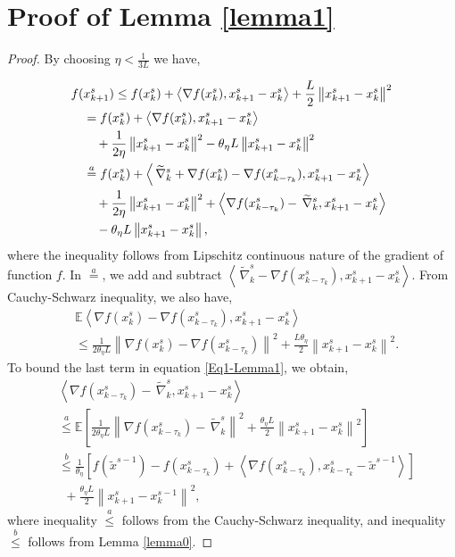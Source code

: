 \documentclass[conference]{IEEEtran}
\newcommand*{\E}{\mathbb{E}}
\newcommand*{\VRG}{\,\widetilde{\nabla}_k^s}
\newcommand{\norm}[1]{\left\lVert#1\right\rVert}
\newcommand{\Iprod}[2]{\left\langle #1,#2\right\rangle}
\theoremstyle{definition}
\theoremstyle{remark}
\begin{document}
\section{Proof of Lemma \ref{lemma1}}\label{append}
\begin{proof}
By choosing $\eta < \frac{1}{3L}$ we have,

\begin{gather}
\label{Eq1-Lemma1}
\begin{split}
f(&x_{k+1}^s)  \leq f(x_{k}^s) + \Iprod{\nabla f(x_{k}^s)}{x_{k+1}^s-x_{k}^s}+\frac{L}{2}\norm{x_{k+1}^s-x_{k}^s}^2\\
&=f(x_{k}^s) + \Iprod{\nabla f(x_{k}^s)}{x_{k+1}^s-x_{k}^s}\\
&~~~+ {\frac{1 }{2\eta}}\norm{x_{k+1}^s-x_{k}^s}^2-{\theta_{\eta} L}\norm{x_{k+1}^s-x_{k}^s}^2\\
&\stackrel{a}{=}f(x_{k}^s) + \Iprod{\VRG+\nabla f(x_{k}^s)-\nabla f(x_{k-\tau_k}^s)}{x_{k+1}^s-x_{k}^s}\\
&~~~+ { \frac{1}{2\eta}}\norm{x_{k+1}^s-x_{k}^s}^2+\Iprod{\nabla f(x_{k-\tau_k}^s)-\VRG}{x_{k+1}^s-x_{k}^s}\\
&~~~-{\theta_{\eta} L}\norm{x_{k+1}^s-x_{k}^s},
\end{split}
\raisetag{15pt}
\end{gather}
where the inequality follows from Lipschitz continuous nature of the gradient of function $f$. In $\stackrel{a}{=}$, we add and subtract $\Iprod{\VRG-\nabla f(x_{k-\tau_k}^s)}{x_{k+1}^s-x_{k}^s}$. From Cauchy-Schwarz inequality, we also have,
\begin{equation}\label{Eq2-Lemma3}
\begin{split}
& \E\Iprod{\nabla f(x_{k}^s)-\nabla f(x_{k-\tau_k}^s)}{x_{k+1}^s-x_{k}^s}\\
&\leq \frac{1}{2 \theta_{\eta} L} \norm{\nabla f(x_{k}^s)-\nabla f(x_{k-\tau_k}^s)}^2+ \frac{L\theta_{\eta}}{2}\norm{x_{k+1}^s-x_{k}^s}^2.
\end{split}
\end{equation}
To bound the last term in equation \eqref{Eq1-Lemma1}, we obtain,
\begin{equation}\label{Eq2-Lemma1}
\begin{split}
&\Iprod{\nabla f(x_{k-\tau_{k}}^s)-\VRG}{x_{k+1}^s-x_{k}^s}\\
&\stackrel{a}{\leq} \E\left[\frac{1}{2\theta_{\eta} L}\norm{\nabla f(x_{k-\tau_{k}}^s)-\VRG}^2 + \frac{\theta_{\eta} L}{2}\norm{x_{k+1}^s-x_{k}^s}^2\right]\\
&\stackrel{b}{\leq} \frac{1}{\theta_{\eta}}\left[f(\widetilde{x}^{s-1})-f(x_{k-\tau_k}^s)+\Iprod{\nabla f(x_{k-\tau_k}^s)}{x_{k-\tau_k}^s-\widetilde{x}^{s-1}}\right]\\
&~~+ \frac{\theta_{\eta} L}{2}\norm{x_{k+1}^{s}-x_{k}^{s-1}}^2,
\end{split}
\end{equation}
where inequality $\stackrel{a}{\leq}$ follows from the Cauchy-Schwarz inequality, and inequality $\stackrel{b}{\leq}$ follows from Lemma \ref{lemma0}. 


\end{proof}
\end{document}
